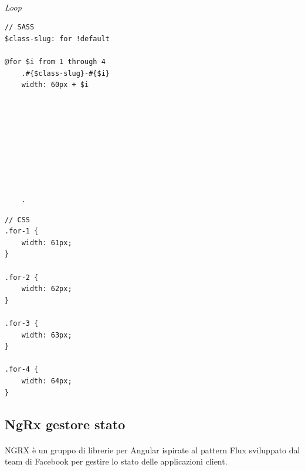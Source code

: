 \paragraph{}
\paragraph{}
\paragraph{}
\paragraph{}
\paragraph{}
\paragraph{}
\paragraph{}

\textit{Loop}


\begin{multicols}{2}
    \begin{lstlisting}
// SASS
$class-slug: for !default

@for $i from 1 through 4
    .#{$class-slug}-#{$i}
    width: 60px + $i









    .
    \end{lstlisting}

    \columnbreak
    \begin{lstlisting}
// CSS
.for-1 {
    width: 61px;
}

.for-2 {
    width: 62px;
}

.for-3 {
    width: 63px;
}

.for-4 {
    width: 64px;
}
    \end{lstlisting}   
\end{multicols}
   

\subsection{NgRx gestore stato}
\paragraph{}
NGRX è un gruppo di librerie per Angular ispirate al pattern Flux sviluppato dal team di Facebook per gestire
lo stato delle applicazioni client.

